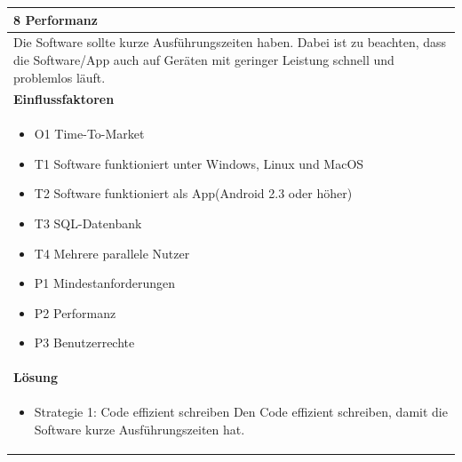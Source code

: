 \documentclass[fontsize=12pt,paper=a4,twoside]{scrartcl}
\begin{document}
\begin{table}[H]
\begin{tabular}{|p{\textwidth}|}\hline
8 Performanz\\ \hline
Die Software sollte kurze Ausführungszeiten haben. Dabei ist zu beachten, dass die Software/App auch auf Geräten mit geringer Leistung schnell und problemlos läuft.\\ \hline
\textbf{Einflussfaktoren}\\
\begin{itemize}
\item O1 Time-To-Market
\item T1 Software funktioniert unter Windows, Linux und MacOS
\item T2 Software funktioniert als App(Android 2.3 oder höher)
\item T3 SQL-Datenbank
\item T4 Mehrere parallele Nutzer
\item P1 Mindestanforderungen
\item P2 Performanz
\item P3 Benutzerrechte
\end{itemize}\\ \hline
\textbf{Lösung}\\
\begin{itemize}
\item Strategie 1: Code effizient schreiben \leavevmode\newline
Den Code effizient schreiben, damit die Software kurze Ausführungszeiten hat.
\end{itemize}\\ \hline
\end{tabular}
\end{table}
\end{document}
